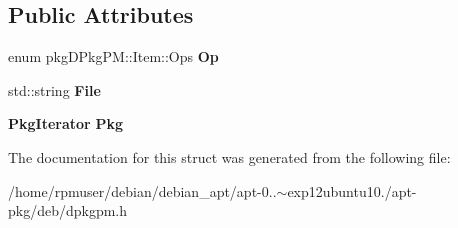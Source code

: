 \subsection*{\-Public \-Attributes}
\begin{DoxyCompactItemize}
\item 
enum pkg\-D\-Pkg\-P\-M\-::\-Item\-::\-Ops {\bfseries \-Op}\label{structpkgDPkgPM_1_1Item_a5b19644b7d14c48b81a8ee447b641290}

\item 
std\-::string {\bfseries \-File}\label{structpkgDPkgPM_1_1Item_ab132f933cf66d57c099dc6226d631deb}

\item 
{\bf \-Pkg\-Iterator} {\bfseries \-Pkg}\label{structpkgDPkgPM_1_1Item_a227c4ee58ef433014fd52236a9448792}

\end{DoxyCompactItemize}


\-The documentation for this struct was generated from the following file\-:\begin{DoxyCompactItemize}
\item 
/home/rpmuser/debian/debian\-\_\-apt/apt-\/0..$\sim$exp12ubuntu10./apt-\/pkg/deb/dpkgpm.\-h\end{DoxyCompactItemize}
